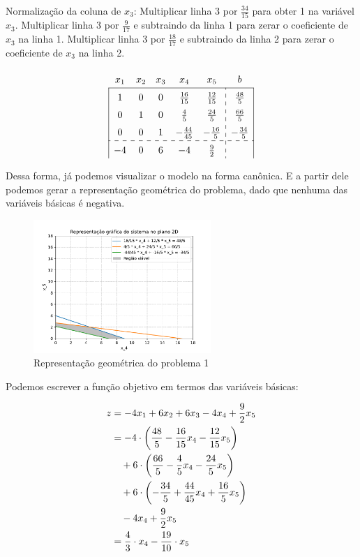 \documentclass{article}
\begin{document}
Normalização da coluna de $x_3$:
Multiplicar linha 3 por $\frac{34}{15}$ para obter 1 na variável $x_3$.
Multiplicar linha 3 por $\frac{9}{17}$ e subtraindo da linha 1 para zerar o coeficiente de $x_3$ na linha 1.
Multiplicar linha 3 por $\frac{18}{17}$ e subtraindo da linha 2 para zerar o coeficiente de $x_3$ na linha 2.

\[
\renewcommand{\arraystretch}{1.5}
\begin{array}{|ccccc:c|}
  x_1 & x_2 & x_3 & x_4 & x_5 & b \\ \hline
    1 & 0 & 0 &  \frac{16}{15} &  \frac{12}{15} &  \frac{48}{5} \\
    0 & 1 & 0 &    \frac{4}{5} &   \frac{24}{5} &  \frac{66}{5} \\
    0 & 0 & 1 & -\frac{44}{45} &  -\frac{16}{5} & -\frac{34}{5} \\ \hdashline
   -4 & 0 & 6 &             -4 &    \frac{9}{2} &
  \end{array}
\]

Dessa forma, já podemos visualizar o modelo na forma canônica.
E a partir dele podemos gerar a representação geométrica do problema, dado que nenhuma das variáveis básicas é negativa.

\begin{figure}[h]
  \centering
  \includegraphics[width=0.6\textwidth]{images/Q1-grafico.pdf}
  \caption{Representação geométrica do problema 1}
\end{figure}

Podemos escrever a função objetivo em termos das variáveis básicas:

\begin{align}
  z &= -4x_1 + 6x_2 + 6x_3 - 4x_4 + \frac{9}{2}x_5 \notag\\
  &= -4 \cdot \left( \frac{48}{5} - \frac{16}{15} x_4 - \frac{12}{15} x_5 \right) \notag\\
  &\quad + 6 \cdot \left( \frac{66}{5} - \frac{4}{5} x_4 - \frac{24}{5} x_5 \right) \notag\\
  &\quad + 6 \cdot \left( -\frac{34}{5} + \frac{44}{45} x_4 + \frac{16}{5} x_5 \right) \notag\\
  &\quad - 4x_4 + \frac{9}{2}x_5 \\
  &= \frac{4}{3} \cdot x_4 - \frac{19}{10} \cdot x_5 \notag
\end{align}
\end{document}
